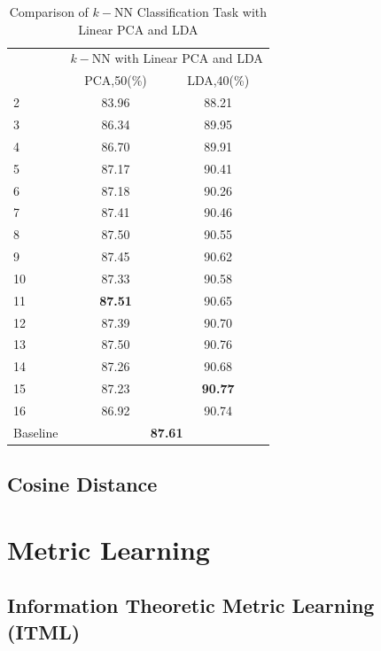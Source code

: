 \documentclass[conference]{IEEEtran}
\begin{document}
\begin{table}[htbp]
	\centering
 	\newcommand{\tabincell}[2]{\begin{tabular}{@{}#1@{}}#2\end{tabular}}
 	\renewcommand\arraystretch{1.0}
 	\caption{Comparison of $k-$NN Classification Task with Linear PCA and LDA}
 	\label{base1_3}%
 		\begin{tabular}{@{}p{1cm}<{\centering}|c|c}
 		\hline
 		\multirow{2}{*}{\diagbox[height=2\line,width=1.42cm,font=\tiny]{$k$}{Acc.}{$\mathit{M}$}} &
 		\multicolumn{2}{c}{$k-$NN with Linear PCA and LDA}\\
 		\cline{2-3}
			& PCA,50(\%) & LDA,40(\%) \\
 		\hline
 		2   & 83.96 & 88.21 \\
 		3   & 86.34 & 89.95 \\
 		4   & 86.70 & 89.91 \\
 		5   & 87.17 & 90.41 \\
 		6   & 87.18 & 90.26 \\
 		7   & 87.41 & 90.46 \\
 		8   & 87.50 & 90.55 \\ 
 		9   & 87.45 & 90.62 \\
 		10   & 87.33 & 90.58 \\
 		11   & \textbf{87.51} & 90.65 \\
 		12   & 87.39 & 90.70 \\
 		13   & 87.50 & 90.76 \\
 		14   & 87.26 & 90.68 \\
 		15   & 87.23 & \textbf{90.77} \\
		16   & 86.92 & 90.74 \\
		\hline
 		Baseline & \multicolumn{2}{c}{\textbf{87.61}} \\
		\hline
		\end{tabular}
\end{table}
\subsection{Cosine Distance}
\section{Metric Learning}
\subsection{Information Theoretic Metric Learning (ITML)}
\end{document}

